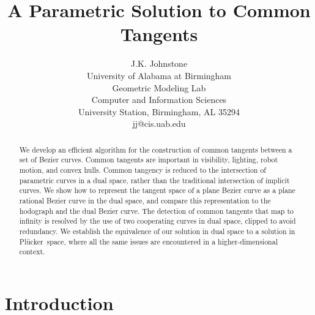 \documentclass[10pt,twocolumn]{article}
\newif\ifTalk
\newcommand{\plucker}{Pl\"{u}cker\ }
\begin{document}
\title{A Parametric Solution to Common Tangents}

\author{J.K. Johnstone\\
	University of Alabama at Birmingham\\
	Geometric Modeling Lab\\
	Computer and Information Sciences\\
	University Station, Birmingham, AL 35294\\
	jj@cis.uab.edu\\
}

\maketitle
\thispagestyle{empty}

\begin{abstract}
We develop an efficient algorithm for the construction of common tangents
between a set of Bezier curves.
Common tangents are important in visibility, lighting, robot motion,
and convex hulls.
Common tangency is reduced to the intersection of parametric curves 
in a dual space, rather than the traditional intersection of implicit curves.
We show how to represent the tangent space of a plane Bezier curve as a 
plane rational Bezier curve in the dual space,
and compare this representation to the hodograph and the dual Bezier curve.
The detection of common tangents that map to infinity
is resolved by the use of two cooperating curves in dual space,
clipped to avoid redundancy.
We establish the equivalence of our solution in dual space to
a solution in \plucker space, where all the same issues are encountered
in a higher-dimensional context.
\end{abstract}

\ifTalk
Where do you throw the ball so that it can be caught by the other curve?
Point/curve: Where do you shoot to hit the target (as you run around a track)?
Where does the spotlight illuminate a given spot?
A common tangent tells where to throw the ball from one curve so that
it can be caught by a second curve.
\fi

\section{Introduction}

\end{document}
